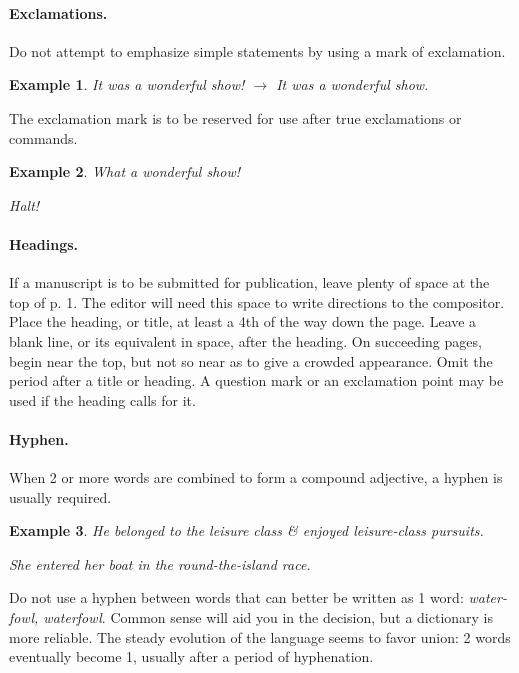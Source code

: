 \documentclass[oneside]{book}
\numberwithin{equation}{section}
\newtheorem{example}{Example}[chapter]
\begin{document}
\paragraph*{Exclamations.} Do not attempt to emphasize simple statements by using a mark of exclamation.

\begin{example}
	It was a wonderful show! $\to$ It was a wonderful show.
\end{example}
The exclamation mark is to be reserved for use after true exclamations or commands.

\begin{example}
	What a wonderful show!
	
	Halt!
\end{example}

\paragraph*{Headings.} If a manuscript is to be submitted for publication, leave plenty of space at the top of p. 1. The editor will need this space to write directions to the compositor. Place the heading, or title, at least a 4th of the way down the page. Leave a blank line, or its equivalent in space, after the heading. On succeeding pages, begin near the top, but not so near as to give a crowded appearance. Omit the period after a title or heading. A question mark or an exclamation point may be used if the heading calls for it.

\paragraph*{Hyphen.} When 2 or more words are combined to form a compound adjective, a hyphen is usually required.

\begin{example}
	He belonged to the leisure class \& enjoyed leisure-class pursuits.
	
	She entered her boat in the round-the-island race.
\end{example}
Do not use a hyphen between words that can better be written as 1 word: \textit{water-fowl, waterfowl}. Common sense will aid you in the decision, but a dictionary is more reliable. The steady evolution of the language seems to favor union: 2 words eventually become 1, usually after a period of hyphenation.
\end{document}

